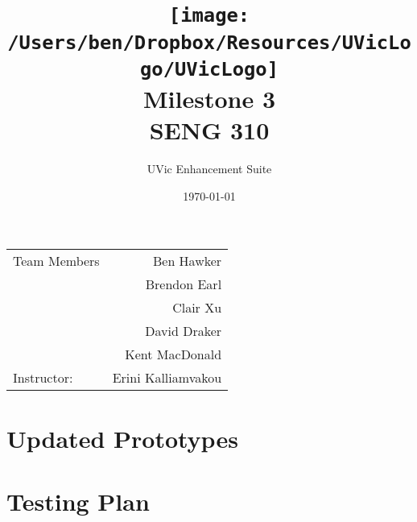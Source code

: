 \documentclass{article}
\title{\texttt{[image: /Users/ben/Dropbox/Resources/UVicLogo/UVicLogo]} \\ \vspace{7mm} Milestone 3 \\ SENG 310} %
\author{UVic Enhancement Suite} %
\date{\today} %
\begin{document}
\maketitle %

\begin{center}
\begin{tabular}{l r}
Team Members & Ben Hawker \\
 & Brendon Earl \\
 & Clair Xu \\
 & David Draker \\
 & Kent MacDonald \\
Instructor: & Erini Kalliamvakou  %
\end{tabular}
\end{center}


\tableofcontents
\pagebreak


\section{Updated Prototypes}



\section{Testing Plan}





%
%
%



%
%
%



\end{document}
